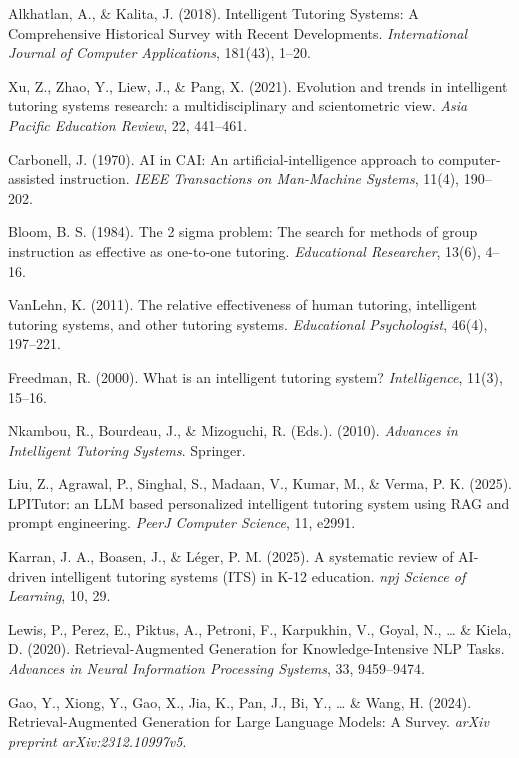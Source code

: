 \documentclass[12pt,A4]{report}
\begin{document}
\begin{thebibliography}{}

Alkhatlan, A., \& Kalita, J. (2018).
Intelligent Tutoring Systems: A Comprehensive Historical Survey with Recent Developments.
\textit{International Journal of Computer Applications}, 181(43), 1--20.

Xu, Z., Zhao, Y., Liew, J., \& Pang, X. (2021).
Evolution and trends in intelligent tutoring systems research: a multidisciplinary and scientometric view.
\textit{Asia Pacific Education Review}, 22, 441--461.

Carbonell, J. (1970).
AI in CAI: An artificial-intelligence approach to computer-assisted instruction.
\textit{IEEE Transactions on Man-Machine Systems}, 11(4), 190--202.

Bloom, B. S. (1984).
The 2 sigma problem: The search for methods of group instruction as effective as one-to-one tutoring.
\textit{Educational Researcher}, 13(6), 4--16.

VanLehn, K. (2011).
The relative effectiveness of human tutoring, intelligent tutoring systems, and other tutoring systems.
\textit{Educational Psychologist}, 46(4), 197--221.

Freedman, R. (2000).
What is an intelligent tutoring system?
\textit{Intelligence}, 11(3), 15--16.

Nkambou, R., Bourdeau, J., \& Mizoguchi, R. (Eds.). (2010).
\textit{Advances in Intelligent Tutoring Systems}. Springer.

Liu, Z., Agrawal, P., Singhal, S., Madaan, V., Kumar, M., \& Verma, P. K. (2025).
LPITutor: an LLM based personalized intelligent tutoring system using RAG and prompt engineering.
\textit{PeerJ Computer Science}, 11, e2991.

Karran, J. A., Boasen, J., \& Léger, P. M. (2025).
A systematic review of AI-driven intelligent tutoring systems (ITS) in K-12 education.
\textit{npj Science of Learning}, 10, 29.

Lewis, P., Perez, E., Piktus, A., Petroni, F., Karpukhin, V., Goyal, N., \ldots{} \& Kiela, D. (2020).
Retrieval-Augmented Generation for Knowledge-Intensive NLP Tasks.
\textit{Advances in Neural Information Processing Systems}, 33, 9459--9474.

Gao, Y., Xiong, Y., Gao, X., Jia, K., Pan, J., Bi, Y., \ldots{} \& Wang, H. (2024).
Retrieval-Augmented Generation for Large Language Models: A Survey.
\textit{arXiv preprint arXiv:2312.10997v5}.


\end{thebibliography}
\end{document}
